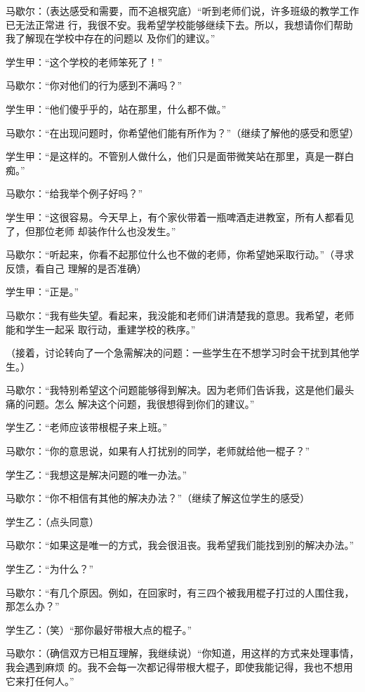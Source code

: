\documentclass{ctexart}
\renewenvironment{quotation}{\setlength{\parskip}{0.5em}\setstretch{1.5}\kaishu\zihao{-5}\setlength{\parindent}{1em}}{\vspace{1em}}
\begin{document}
\begin{quotation}
	马歇尔：（表达感受和需要，而不追根究底）``听到老师们说，许多班级的教学工作已无法正常进
	行，我很不安。我希望学校能够继续下去。所以，我想请你们帮助我了解现在学校中存在的问题以
	及你们的建议。''

	学生甲：``这个学校的老师笨死了！''

	马歇尔：``你对他们的行为感到不满吗？''

	学生甲：``他们傻乎乎的，站在那里，什么都不做。''

	马歇尔：``在出现问题时，你希望他们能有所作为？''（继续了解他的感受和愿望）

	学生甲：``是这样的。不管别人做什么，他们只是面带微笑站在那里，真是一群白痴。''

	马歇尔：``给我举个例子好吗？''

	学生甲：``这很容易。今天早上，有个家伙带着一瓶啤酒走进教室，所有人都看见了，但那位老师
	却装作什么也没发生。''

	马歇尔：``听起来，你看不起那位什么也不做的老师，你希望她采取行动。''（寻求反馈，看自己
	理解的是否准确）

	学生甲：``正是。''

	马歇尔：``我有些失望。看起来，我没能和老师们讲清楚我的意思。我希望，老师能和学生一起采
	取行动，重建学校的秩序。''

	（接着，讨论转向了一个急需解决的问题：一些学生在不想学习时会干扰到其他学生。）

	马歇尔：``我特别希望这个问题能够得到解决。因为老师们告诉我，这是他们最头痛的问题。怎么
	解决这个问题，我很想得到你们的建议。''

	学生乙：``老师应该带根棍子来上班。''

	马歇尔：``你的意思说，如果有人打扰别的同学，老师就给他一棍子？''

	学生乙：``我想这是解决问题的唯一办法。''

	马歇尔：``你不相信有其他的解决办法？''（继续了解这位学生的感受）

	学生乙：（点头同意）

	马歇尔：``如果这是唯一的方式，我会很沮丧。我希望我们能找到别的解决办法。''

	学生乙：``为什么？''

	马歇尔：``有几个原因。例如，在回家时，有三四个被我用棍子打过的人围住我，那怎么办？''

	学生乙：（笑）``那你最好带根大点的棍子。''

	马歇尔：（确信双方已相互理解，我继续说）``你知道，用这样的方式来处理事情，我会遇到麻烦
	的。我不会每一次都记得带根大棍子，即使我能记得，我也不想用它来打任何人。''


\end{quotation}
\end{document}
